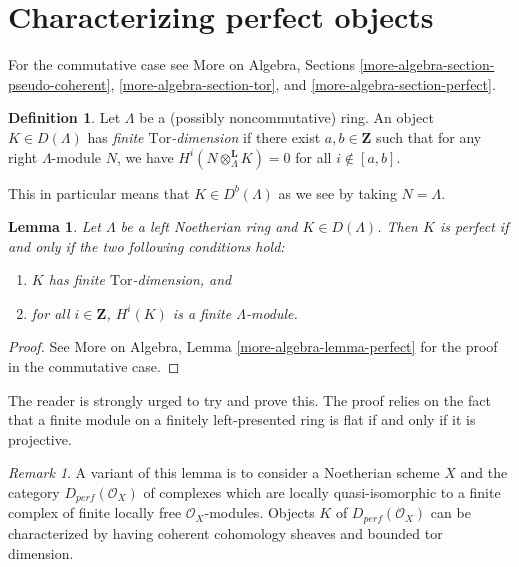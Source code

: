 \documentclass{stacks-project}
\theoremstyle{plain}
\newtheorem{lemma}[subsection]{Lemma}
\theoremstyle{definition}
\newtheorem{definition}[subsection]{Definition}
\theoremstyle{remark}
\newtheorem{remark}[subsection]{Remark}
\numberwithin{equation}{subsection}
\begin{document}
\section{Characterizing perfect objects}
\label{section-characterizing-perfect}

\noindent
For the commutative case see
More on Algebra, Sections
\ref{more-algebra-section-pseudo-coherent},
\ref{more-algebra-section-tor}, and
\ref{more-algebra-section-perfect}.

\begin{definition}
\label{definition-finite-tor-dimension}
Let $\Lambda$ be a (possibly noncommutative) ring.
An object $K\in D(\Lambda)$ has {\it finite $\text{Tor}$-dimension}
if there exist $a, b \in \mathbf{Z}$ such that for any
right $\Lambda$-module $N$, we have
$H^i(N \otimes_{\Lambda}^\mathbf{L} K) = 0$ for all
$i \not \in [a, b]$.
\end{definition}

\noindent
This in particular means that $K \in D^b(\Lambda)$ as we see by taking
$N = \Lambda$.

\begin{lemma}
\label{lemma-characterize-perfect}
Let $\Lambda$ be a left Noetherian ring and $K\in D(\Lambda)$. Then $K$ is
perfect if and only if the two following conditions hold:
\begin{enumerate}
\item
$K$ has finite $\text{Tor}$-dimension, and
\item
for all $i \in \mathbf{Z}$, $H^i(K)$ is a finite $\Lambda$-module.
\end{enumerate}
\end{lemma}

\begin{proof}
See More on Algebra, Lemma \ref{more-algebra-lemma-perfect}
for the proof in the commutative case.
\end{proof}

\noindent
The reader is strongly urged to try and prove this. The proof relies on the
fact that a finite module on a finitely left-presented ring is flat if and only
if it is projective.

\begin{remark}
\label{remark-variant}
A variant of this lemma is to consider a Noetherian scheme $X$
and the category $D_{perf}(\mathcal{O}_X)$ of complexes which are locally
quasi-isomorphic to a finite complex of finite locally free
$\mathcal{O}_X$-modules. Objects $K$ of $D_{perf}(\mathcal{O}_X)$
can be characterized by having coherent cohomology sheaves and
bounded tor dimension.
\end{remark}
\end{document}
